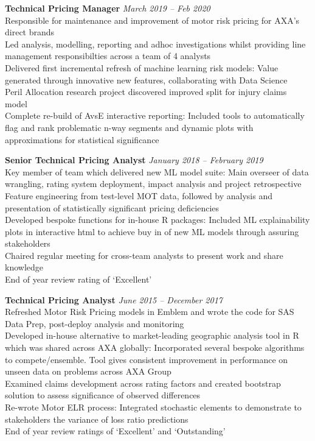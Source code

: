 \documentclass[11pt]{article}
\begin{document}
\begin{description}
\textbf{Technical Pricing Manager} \emph{March 2019 -- Feb 2020}\\
\textbullet \quad Responsible for maintenance and improvement of motor risk pricing for AXA's direct brands\\
\textbullet \quad Led analysis, modelling, reporting and adhoc investigations whilst providing line management responsibilties across a team of 4 analysts\\
\textbullet \quad Delivered first incremental refresh of machine learning risk models: Value generated through innovative new features, collaborating with Data Science\\
\textbullet \quad Peril Allocation research project discovered improved split for injury claims model\\
\textbullet \quad Complete re-build of AvsE interactive reporting: Included tools to automatically flag and rank problematic n-way segments and dynamic plots with approximations for statistical significance

\textbf{Senior Technical Pricing Analyst} \emph{January 2018 -- February 2019}\\
\textbullet \quad Key member of team which delivered new ML model suite: Main overseer of data wrangling, rating system deployment, impact analysis and project retrospective \\
\textbullet \quad Feature engineering from test-level MOT data, followed by analysis and presentation of statistically significant pricing deficiencies \\
\textbullet \quad Developed bespoke functions for in-house R packages: Included ML explainability plots in interactive html to achieve buy in of new ML models through assuring stakeholders\\
\textbullet \quad Chaired regular meeting for cross-team analysts to present work and share knowledge \\
\textbullet \quad End of year review rating of `Excellent'

\textbf{Technical Pricing Analyst} \emph{June 2015 -- December 2017}\\
\textbullet \quad Refreshed Motor Risk Pricing models in Emblem and wrote the code for SAS Data Prep, post-deploy analysis and monitoring \\
\textbullet \quad Developed in-house alternative to market-leading geographic analysis tool in R which was shared across AXA globally: Incorporated several bespoke algorithms to compete/ensemble. Tool gives consistent improvement in performance on unseen data on problems across AXA Group\\
\textbullet \quad Examined claims development across rating factors and created bootstrap solution to assess significance of observed differences \\
\textbullet \quad Re-wrote Motor ELR process: Integrated stochastic elements to demonstrate to stakeholders the variance of loss ratio predictions \\
\textbullet \quad End of year review ratings of `Excellent' and `Outstanding'


\end{description}
\end{document}
